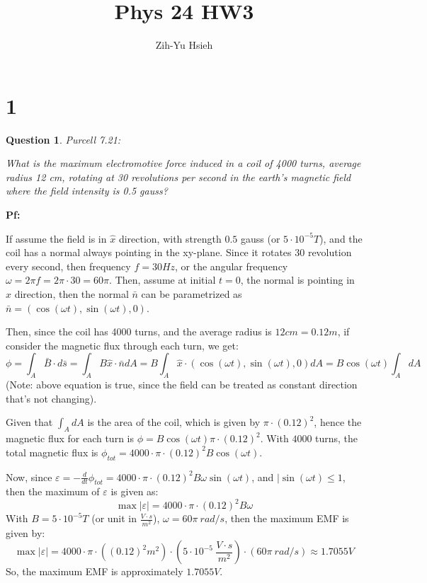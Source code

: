 \documentclass{article}
\title{Phys 24 HW3}
\author{Zih-Yu Hsieh}
\newtheorem{question}{Question}
\begin{document}
\maketitle

\section*{1}
\begin{myBox}[]{}
    \begin{question}
        Purcell 7.21:

        What is the maximum electromotive force induced in a coil of
        4000 turns, average radius 12 cm, rotating at 30 revolutions per
        second in the earth’s magnetic field where the field intensity is
        0.5 gauss?
    \end{question}
\end{myBox}

\textbf{Pf:}

If assume the field is in $\hat{x}$ direction, with strength $0.5$ gauss (or $5\cdot 10^{-5} T$), and the coil has a normal always pointing in the xy-plane.
Since it rotates 30 revolution every second, then frequency $f=30 Hz$, or the angular frequency $\omega = 2\pi f = 2\pi \cdot 30 = 60\pi$.
Then, assume at initial $t=0$, the normal is pointing in $\hat{x}$ direction, then the normal $\bar{n}$ can be parametrized as $\bar{n}=(\cos(\omega t),\sin (\omega t),0)$.

\hfill

Then, since the coil has 4000 turns, and the average radius is $12 cm = 0.12 m$, if consider the magnetic flux through each turn, we get:
$$\phi = \int_A\bar{B}\cdot d\bar{s} = \int_A B\hat{x} \cdot\bar{n} dA = B\int_A\hat{x}\cdot (\cos(\omega t),\sin(\omega t),0)dA = B\cos(\omega t)\int_AdA$$
(Note: above equation is true, since the field can be treated as constant direction that's not changing).

Given that $\int_A dA$ is the area of the coil, which is given by $\pi \cdot (0.12)^2$, hence the magnetic flux for each turn is $\phi = B\cos(\omega t)\pi \cdot (0.12)^2$.
With $4000$ turns, the total magnetic flux is $\phi_{tot}=4000 \cdot \pi \cdot (0.12)^2 B\cos(\omega t)$.

\hfill

Now, since $\varepsilon=-\frac{d}{dt}\phi_{tot} = 4000\cdot\pi\cdot(0.12)^2B\omega\sin(\omega t)$, and $|\sin(\omega t)\leq 1$, then the maximum of $\varepsilon$ is given as:
$$\max|\varepsilon| =4000\cdot \pi \cdot (0.12)^2 B\omega $$
With $B=5\cdot 10^{-5}T$ (or unit in $\frac{V\cdot s}{m^2}$), $\omega = 60\pi\ rad/s$, then the maximum EMF is given by:
$$\max|\varepsilon| = 4000\cdot\pi\cdot((0.12)^2m^2)\cdot \left(5\cdot 10^{-5}\ \frac{V\cdot s}{m^2}\right)\cdot (60\pi\ rad/s) \approx 1.7055 V$$
So, the maximum EMF is approximately $1.7055 V$.
\end{document}
